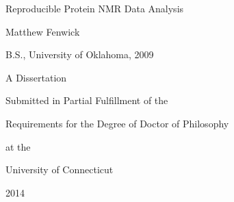 \begin{titlepage}
  \begin{center}

Reproducible Protein NMR Data Analysis

Matthew Fenwick

B.S., University of Oklahoma, 2009

\vfill

A Dissertation 

Submitted in Partial Fulfillment of the 

Requirements for the Degree of Doctor of Philosophy 

at the 

University of Connecticut 


2014
  \end{center}
\end{titlepage}

